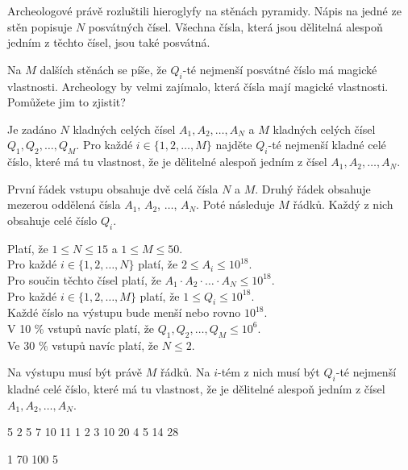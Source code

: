 





Archeologové právě rozluštili hieroglyfy na stěnách pyramidy. Nápis na jedné ze
stěn popisuje $N$ posvátných čísel. Všechna čísla, která jsou dělitelná alespoň
jedním z těchto čísel, jsou také posvátná.

Na $M$ dalších stěnách se píše, že $Q_i$-té nejmenší posvátné číslo má magické
vlastnosti. Archeology by velmi zajímalo, která čísla mají magické vlastnosti.
Pomůžete jim to zjistit?


Je zadáno $N$ kladných celých čísel $A_1, A_2, \ldots, A_N$ a $M$ kladných
celých čísel $Q_1, Q_2, \ldots, Q_M$. Pro každé $i \in \{ 1, 2, \ldots, M \}$
najděte $Q_i$-té nejmenší kladné celé číslo, které má tu vlastnost, že je
dělitelné alespoň jedním z čísel $A_1, A_2, \ldots, A_N$.


První řádek vstupu obsahuje dvě celá čísla $N$ a $M$. Druhý řádek obsahuje
mezerou oddělená čísla $A_1$, $A_2$, $\ldots$, $A_N$. Poté následuje $M$ řádků.
Každý z nich obsahuje celé číslo $Q_i$.

\bigskip
\noindent
Platí, že $1 \leq N \leq 15$ a $1 \leq M \leq 50$.\\
Pro každé $i \in \{ 1, 2, \ldots, N \}$ platí, že $2 \leq A_i \leq 10^{18}$.\\
Pro součin těchto čísel platí, že $A_1 \cdot A_2 \cdot \ldots \cdot A_N \leq 10^{18}$.\\
Pro každé $i \in \{ 1, 2, \ldots, M \}$ platí, že $1 \leq Q_i \leq 10^{18}$.\\
Každé číslo na výstupu bude menší nebo rovno $10^{18}$.\\
V 10 \% vstupů navíc platí, že $Q_1, Q_2, \ldots, Q_M \leq 10^6$.\\
Ve 30 \% vstupů navíc platí, že $N \leq 2$.


Na výstupu musí být právě $M$ řádků. Na $i$-tém z nich musí být $Q_i$-té
nejmenší kladné celé číslo, které má tu vlastnost, že je dělitelné alespoň
jedním z čísel $A_1, A_2, \ldots, A_N$.


 5
2 5 7 10 11
1
2
3
10
20
4
5
14
28
\sampleEND

 1
70 100
5
\sampleEND



